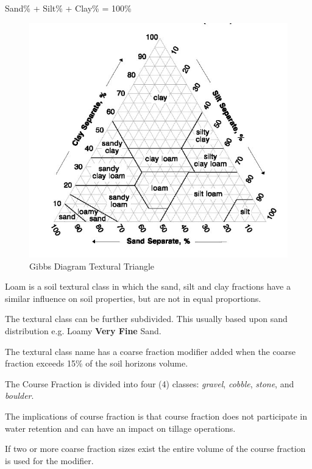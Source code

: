 \documentclass[a5paper]{report}
\begin{document}
\begin{center}
Sand\% + Silt\% + Clay\% = 100\%
\end{center}
    
\begin{figure}
    \centering
    \includegraphics{images/TexturalTriangle.jpg}
    \caption{Gibbs Diagram Textural Triangle}
    \label{fig:TexturalTriangle}
\end{figure}
    
Loam is a soil textural class in which the sand, silt and clay fractions have a similar influence on soil properties, but are not in equal proportions.
    
The textural class can be further subdivided. This usually based upon sand distribution e.g. Loamy \textbf{Very Fine} Sand.
    
The textural class name has a coarse fraction modifier added when the coarse fraction exceeds 15\% of the soil horizons volume.
    
The Course Fraction is divided into four (4) classes: \emph{gravel}, \emph{cobble}, \emph{stone}, and \emph{boulder}.
    
The implications of course fraction is that course fraction does not participate in water retention and can have an impact on tillage operations.
    
If two or more coarse fraction sizes exist the entire volume of the course fraction is used for the modifier.
    
\end{document}
